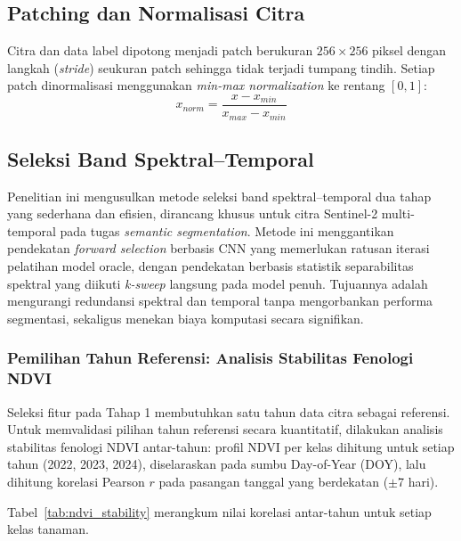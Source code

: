 \subsection{Patching dan Normalisasi Citra}
Citra dan data label dipotong menjadi patch berukuran $256\times256$ piksel dengan langkah (\textit{stride}) seukuran patch sehingga tidak terjadi tumpang tindih.
Setiap patch dinormalisasi menggunakan \textit{min-max normalization} ke rentang $[0, 1]$:
\begin{equation}
    x_{norm} = \frac{x - x_{min}}{x_{max} - x_{min}}
\end{equation}

\subsection{Seleksi Band Spektral--Temporal}

Penelitian ini mengusulkan metode seleksi band spektral--temporal dua tahap yang sederhana dan efisien, dirancang khusus untuk citra Sentinel-2 multi-temporal pada tugas \textit{semantic segmentation}.
Metode ini menggantikan pendekatan \textit{forward selection} berbasis CNN yang memerlukan ratusan iterasi pelatihan model oracle, dengan pendekatan berbasis statistik separabilitas spektral yang diikuti \textit{k-sweep} langsung pada model penuh.
Tujuannya adalah mengurangi redundansi spektral dan temporal tanpa mengorbankan performa segmentasi, sekaligus menekan biaya komputasi secara signifikan.

\subsubsection{Pemilihan Tahun Referensi: Analisis Stabilitas Fenologi NDVI}
\label{subsubsec:tahun_referensi}

Seleksi fitur pada Tahap 1 membutuhkan satu tahun data citra sebagai referensi.
Untuk memvalidasi pilihan tahun referensi secara kuantitatif, dilakukan analisis stabilitas fenologi NDVI antar-tahun: profil NDVI per kelas dihitung untuk setiap tahun (2022, 2023, 2024), diselaraskan pada sumbu Day-of-Year (DOY), lalu dihitung korelasi Pearson $r$ pada pasangan tanggal yang berdekatan ($\pm$7 hari).

Tabel~\ref{tab:ndvi_stability} merangkum nilai korelasi antar-tahun untuk setiap kelas tanaman.

